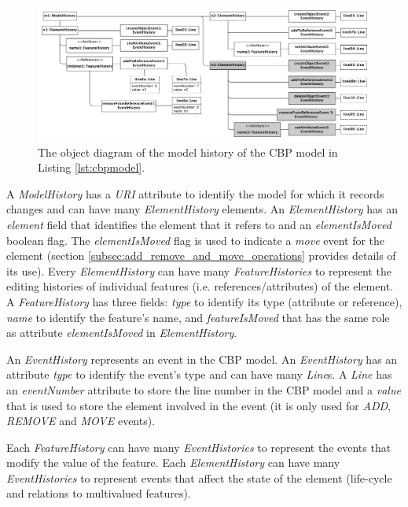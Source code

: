 \documentclass{llncs}
\begin{document}
\begin{figure}[ht]
\centering
\includegraphics[width=\linewidth]{history_structure}
\caption{The object diagram of the model history of the CBP model in Listing \ref{lst:cbpmodel}.}
\label{fig:history_structure}
\end{figure}

A \emph{ModelHistory} has a \emph{URI} attribute to identify the model for which it records changes and can have many \emph{ElementHistory} elements.
An \emph{ElementHistory} has an \emph{element} field that identifies the element that it refers to and an \emph{elementIsMoved} boolean flag. The  \emph{elementIsMoved} flag is used to indicate a \emph{move} event for the element (section \ref{subsec:add_remove_and_move_operations} provides details of its use).
Every \emph{ElementHistory} can have many \emph{FeatureHistories} to represent the editing histories of individual features (i.e. references/attributes) of the element. 
A \emph{FeatureHistory} has three fields: \emph{type} to identify its type (attribute or reference), \emph{name} to identify the feature's name, and \emph{featureIsMoved} that has the same role as attribute \emph{elementIsMoved} in \emph{ElementHistory}.

An \emph{EventHistory} represents an event in the CBP model.
An \emph{EventHistory} has an attribute \emph{type} to identify the event's type and can have many \emph{Line}s.
A \emph{Line} has an \emph{eventNumber} attribute to store the line number in the CBP model and a \emph{value} that is used to store the element involved in the event (it is only used for \emph{ADD}, \emph{REMOVE} and \emph{MOVE} events).

Each \emph{FeatureHistory} can have many \emph{EventHistories} to represent the events that modify the value of the feature.
Each \emph{ElementHistory} can have many \emph{EventHistories} to represent events that affect the state of the element (life-cycle and relations to multivalued features).
\end{document}
